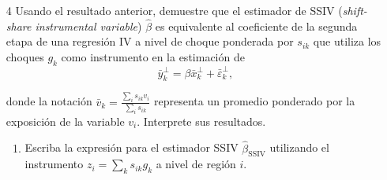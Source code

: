 \documentclass[a4paper, answers, addpoints, 11pt]{exam}
\newenvironment{solucion}{%
  \begin{mdframed}[
    backgroundcolor=blue!5,    %
    linecolor=blue!50,          %
    linewidth=2pt,              %
    leftmargin=10pt,            %
    rightmargin=8pt,           %
    topline=true,              %
    bottomline=true,            %
    roundcorner=10pt,           %
    innerleftmargin=10pt,       %
    innerrightmargin=10pt,      %
    innerbottommargin=10pt,     %
    innertopmargin=10pt         %
  ]%
  \begin{tcolorbox}[colframe=blue!50!black, colback=blue!50, coltitle=white, sharp corners=all, boxrule=1mm, width=\textwidth, halign=left, valign=center, top=0mm, bottom=0mm, left=0mm, right=0mm] \textbf{Solución} \end{tcolorbox} }{\end{mdframed}}
\begin{document}
\begin{enumerate}
\begin{solucion}
\begin{proof}
Ahora, podemos escribir el estimador de regresión simple como:
\begin{align*}
    \hat{\beta} 
    &= \frac{\text{Cov}(y_i^\perp, \hat{x}_i^\perp)}{\text{Var}(\hat{x}_i^\perp)} \\[5pt]
    &= \frac{\sum_i y_i^\perp \hat{x}_i^\perp}{\sum_i (\hat{x}_i^\perp)^2} \\[5pt]
    &= \frac{\sum_i y_i^\perp (\hat{\pi} z_i)}{\sum_i (\hat{\pi} z_i)^2} \\[5pt]
    &= \frac{\hat{\pi} \sum_i y_i^\perp z_i}{\hat{\pi}^2 \sum_i z_i^2} \\[5pt]
    &= \frac{\sum_i y_i^\perp z_i}{\hat{\pi} \sum_i z_i^2} \\[5pt]
    &= \frac{\sum_i y_i^\perp z_i}{\sum_i z_i (\hat{\pi} z_i)} \quad \text{(sabemos que } \hat{\pi} z_i = \hat{x}_i^\perp) \\[5pt]
    &= \frac{\sum_i y_i^\perp z_i}{\sum_i z_i x_i^\perp}\\[5pt]
    &=  \frac{\sum_i z_i y_i^\perp}{\sum_i z_i x_i^\perp} \quad \text{(reordenando) }
\end{align*}

Por el teorema de  Frisch-Waugh-Lovell (FWL), sabemos que el coeficiente instrumentalizado de la regresión estructural es el mismo de la regresión instrumentalizada de $y_i^\perp$  $x_i^\perp$. 

\end{proof}
\end{solucion}

\item[4] Usando el resultado anterior, demuestre que el estimador de SSIV (\textit{shift-share instrumental variable}) $\hat{\beta}$ es equivalente al coeficiente de la segunda etapa de una regresión IV a nivel de choque ponderada por $s_{ik}$ que utiliza los choques $g_k$ como instrumento en la estimación de 
    $$ \bar{y}^\perp_k = \beta \bar{x}^\perp_k + \bar{\varepsilon}^\perp_k, $$

    donde la notación $\bar{v}_k = \frac{\sum_i s_{ik} v_i}{\sum_i s_{ik}}$ representa un promedio ponderado por la exposición de la variable $v_i$. Interprete sus resultados.

    \begin{enumerate}[label=\alph*)]
        \item Escriba la expresión para el estimador SSIV $\hat{\beta}_{\text{SSIV}}$ utilizando el instrumento $z_i = \sum_k s_{ik}g_k$ a nivel de región $i$.
        

\end{enumerate}
\end{enumerate}
\end{document}
